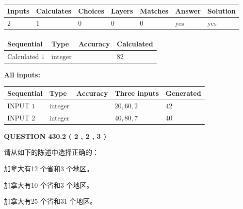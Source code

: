 \documentclass{ctexart}
\begin{document}
   
\noindent\begin{tabular}{|l|l|l|l|l|l|l|}
 \hline
Inputs & Calculates & Choices & Layers & Matches & Answer & Solution \\ \hline
 2  & 
 1  & 
 0
  & 
 0  & 
 0  & 
  yes & 
  yes 
  \\ \hline
 \end{tabular}
   
   
   
   
\noindent{}
   
   
  
  
\noindent\begin{tabular}{|l|l|l|l|}
\hline
 Sequential & Type & Accuracy & Calculated \\ 
\hline
 
 
  Calculated $  1 $ & integer &  & 
  $ 82 $ 
 \\  \hline  
 \end{tabular}
   
   
   
   
\noindent\vspace{0.1in}\hspace{-0.08in} {\textbf{\Large{All inputs: }}}
   
   
  
  
\noindent\begin{tabular}{|l|l|l|l|l|}
\hline
 Sequential & Type & Accuracy & Three inputs & Generated \\ 
\hline
 
 
  INPUT $  1 $ & integer &  & $
 20
 , 
 60
 , 
 2
 $ & $ 42 $ 
 \\  \hline  
 
 
  INPUT $  2 $ & integer &  & $
 40
 , 
 80
 , 
 7
 $ & $ 40 $ 
 \\  \hline  
 \end{tabular}
   
   
  
\vspace{0.2in}
  
{\textbf{\Large{QUESTION
430.2 
 ( 2 , 2 , 3 )
}}}
  
  
请从如下的陈述中选择正确的：
 
 
加拿大有12 个省和3 个地区。
 
 
加拿大有10 个省和3 个地区。
 
 
加拿大有25 个省和31 个地区。
 
\end{document}
